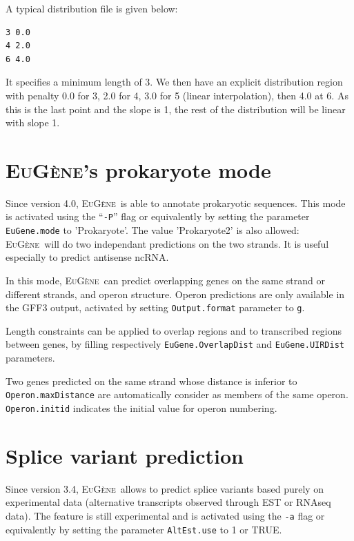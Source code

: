 \documentclass[a4paper,titlepage]{report}
\newcommand{\EuGene}{\textsc{EuG\`ene}}
\begin{document}
A
typical distribution file is given below:
\begin{Verbatim}
3 0.0
4 2.0
6 4.0
\end{Verbatim}

It specifies a minimum length of 3. We then have an explicit
distribution region with penalty 0.0 for 3, 2.0 for 4, 3.0 for 5
(linear interpolation), then 4.0 at 6. As this is the last point
and the slope is 1, the rest of the distribution will be linear
with slope 1.

\section{\EuGene's prokaryote mode}
\label{prok}

Since version 4.0, \EuGene\ is able to annotate prokaryotic sequences. This mode is activated using 
the ``\texttt{-P}'' flag or equivalently by setting the parameter \texttt{EuGene.mode} to 'Prokaryote'.
The value 'Prokaryote2' is also allowed: \EuGene\ will do two independant predictions on the two strands. 
It is useful especially to predict antisense ncRNA.

In this mode, \EuGene\ can predict overlapping genes on the same strand or different strands, and operon structure.
Operon predictions are only available in the GFF3 output, activated by setting \texttt{Output.format} parameter 
to \texttt{g}.

Length constraints can be applied to overlap regions and to transcribed regions between genes, by filling respectively 
 \texttt{EuGene.OverlapDist} and \texttt{EuGene.UIRDist} parameters.

Two genes predicted on the same strand whose distance is inferior to \texttt{Operon.maxDistance} 
are automatically consider as members of the same operon. 
\texttt{Operon.initid} indicates the initial value for operon numbering.
   


\section{Splice variant prediction}

Since version 3.4, \EuGene\ allows to predict splice variants based purely on
experimental data (alternative transcripts observed through EST or RNAseq data). 
The feature is still experimental and is activated using the \texttt{-a} flag or 
equivalently by setting the parameter \texttt{AltEst.use} to 1 or 
TRUE.
\end{document}
